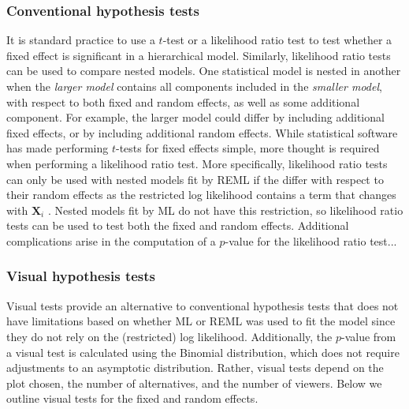 \documentclass{article} %
\begin{document}
\subsubsection{Conventional hypothesis tests}
It is standard practice to use a $t$-test or a likelihood ratio test to test whether a fixed effect is significant in a hierarchical model. Similarly, likelihood ratio tests can be used to compare nested models. One statistical model is nested in another when the \emph{larger model} contains all components included in the \emph{smaller model}, with respect to both fixed and random effects, as well as some additional component. For example, the larger model could differ by including additional fixed effects, or by including additional random effects. While statistical software has made performing $t$-tests for fixed effects simple, more thought is required when performing a likelihood ratio test. More specifically, likelihood ratio tests can only be used with nested models fit by REML if the differ with respect to their random effects  as the restricted log likelihood contains a term that changes with $\bm{X}_i$ \citep[c.f.,][Section 2.2.5]{Pinhiero:2000vf}. Nested models fit by ML do not have this restriction, so likelihood ratio tests can be used to test both the fixed and random effects. Additional complications arise in the computation of a $p$-value for the likelihood ratio test...



\subsubsection{Visual hypothesis tests}
Visual tests provide an alternative to conventional hypothesis tests that does not have limitations based on whether ML or REML was used to fit the model since they do not rely on the (restricted) log likelihood. Additionally, the $p$-value from a visual test is calculated using the Binomial distribution, which does not require adjustments to an asymptotic distribution. Rather, visual tests depend on the plot chosen, the number of alternatives, and the number of viewers. Below we outline visual tests for the fixed and random effects.
\end{document}
